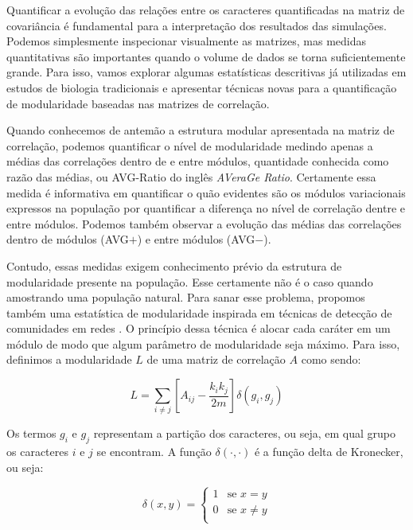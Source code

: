 Quantificar a evolução das relações entre os caracteres quantificadas na
matriz de covariância é fundamental para a interpretação dos resultados
das simulações.
Podemos simplesmente inspecionar visualmente as matrizes, mas medidas
quantitativas são importantes quando o volume de dados se torna
suficientemente grande.
Para isso, vamos explorar algumas estatísticas descritivas já utilizadas em
estudos de biologia tradicionais e apresentar técnicas novas para a
quantificação de modularidade baseadas nas matrizes de correlação.

Quando conhecemos de antemão a estrutura modular apresentada na matriz
de correlação, podemos quantificar o nível de modularidade medindo
apenas a médias das correlações dentro de e entre módulos, quantidade
conhecida como razão das médias, ou AVG-Ratio do inglês {\it AVeraGe Ratio}.
Certamente essa medida é informativa em quantificar o quão evidentes são
os módulos variacionais expressos na população por quantificar a
diferença no nível de correlação dentre e entre módulos.
Podemos também observar a evolução das médias das correlações dentro
de módulos (AVG$+$) e entre módulos (AVG$-$).

Contudo, essas medidas exigem conhecimento prévio da estrutura de
modularidade presente na população.
Esse certamente não é o caso quando amostrando uma população natural.
Para sanar esse problema, propomos também uma estatística de
modularidade inspirada em técnicas de detecção de comunidades em redes
\citep{Newman2006,Newman2006a,Reichardt2006}.
O princípio dessa técnica é alocar cada caráter em um módulo de modo que
algum parâmetro de modularidade seja máximo.
Para isso, definimos a modularidade $L$ de uma matriz de correlação $A$
como sendo:

\begin{equation}
   L = \sum_{i \neq j} \left[ A_{ij} - \frac{k_ik_j}{2m} \right] \delta(g_i, g_j)
\end{equation}

Os termos $g_i$ e $g_j$ representam a partição dos caracteres, ou seja, em
qual grupo os caracteres $i$ e $j$ se encontram.
A função $\delta(\cdot,\cdot)$ é a função delta de Kronecker, ou seja:

\begin{equation}
   \delta (x,y) = \left \{ 
      \begin{array}{rl}
          1 & \text{se } x = y\\
          0 & \text{se } x \neq y\\
      \end{array} \right.
\end{equation}

